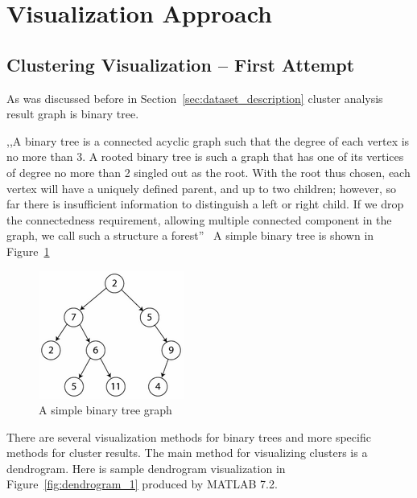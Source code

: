 \section{Visualization Approach}
\label{sec:solution}

\subsection{Clustering Visualization -- First Attempt}
\label{sec:probe}

As was discussed before in Section~\ref{sec:dataset_description} cluster analysis result graph is binary tree.

,,A binary tree is a connected acyclic graph such that the degree of each vertex is no more than 3. A rooted binary tree is such a graph that has one of its vertices of degree no more than 2 singled out as the root. With the root thus chosen, each vertex will have a uniquely defined parent, and up to two children; however, so far there is insufficient information to distinguish a left or right child. If we drop the connectedness requirement, allowing multiple connected component in the graph, we call such a structure a forest''~\cite{BINARY_TREE} A simple binary tree is shown in Figure~\ref{fig:simple_binary_tree}

\begin{figure}[h!]
\centering
\includegraphics[scale=1.0]{pictures/simple_binary_tree.png}
\caption{A simple binary tree graph}
\label{fig:simple_binary_tree}
\end{figure}

There are several visualization methods for binary trees and more specific methods for cluster results. The main method for visualizing clusters is a dendrogram. Here is sample dendrogram visualization in Figure~\ref{fig:dendrogram_1} produced by MATLAB 7.2.

